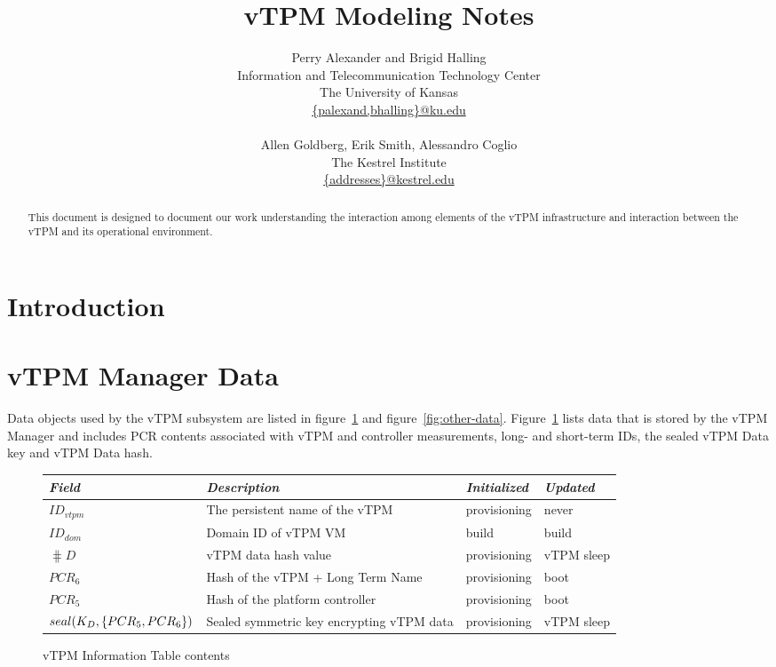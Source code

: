 \documentclass[10pt]{article}
\title{vTPM Modeling Notes}
\author{Perry Alexander and Brigid Halling \\
  Information and Telecommunication Technology Center \\
  The University of Kansas \\
  \url{{palexand,bhalling}@ku.edu} \\
  \\
  Allen Goldberg, Erik Smith, Alessandro Coglio \\
  The Kestrel Institute \\
  \url{{addresses}@kestrel.edu}}
\begin{document}
\maketitle
\tableofcontents
\listoffigures
\listoftables

\begin{abstract}
  This document is designed to document our work understanding the
  interaction among elements of the vTPM infrastructure and
  interaction between the vTPM and its operational environment.
\end{abstract}

\section{Introduction}

\section{vTPM Manager Data}

Data objects used by the vTPM subsystem are listed in
figure~\ref{fig:vtpm-information-table-format} and
figure~\ref{fig:other-data}.
Figure~\ref{fig:vtpm-information-table-format} lists data that is
stored by the vTPM Manager and includes PCR contents associated with
vTPM and controller measurements, long- and short-term IDs, the sealed
vTPM Data key and vTPM Data hash.

\begin{figure}[hbtp]
  \centering
  \begin{tabular}{llll}
    \emph{Field} & \emph{Description} & \emph{Initialized} &
    \emph{Updated} \\ \hline
    $ID_{vtpm}$ & The persistent name of the vTPM & provisioning &
    never \\
    $ID_{dom}$ & Domain ID of vTPM VM & build & build \\
    $\hash{D}$ & vTPM data hash value & provisioning & vTPM sleep \\
    $PCR_6$ & Hash of the vTPM + Long Term Name & provisioning & boot
    \\
    $PCR_5$ & Hash of the platform controller & provisioning & boot \\
    $seal(K_D,\{PCR_5,PCR_6\})$ & Sealed symmetric key encrypting vTPM data &
    provisioning & vTPM sleep \\
  \end{tabular}
  \caption{vTPM Information Table contents}
  \label{fig:vtpm-information-table-format}
\end{figure}
\end{document}
